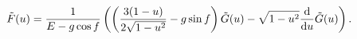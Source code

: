 \begin{equation}
\label{tildeF}
{\tilde F}(u) = \frac{1}{E - g \cos f}\left(
\left(
\frac{3(1 - u)}{2 \sqrt{1-u^2}} - g \sin f
\right) {\tilde G}(u) 
- \sqrt{1 - u^2} \frac{{\rm d}}{{\rm d}u} {\tilde G}(u)
\right).
\end{equation}

